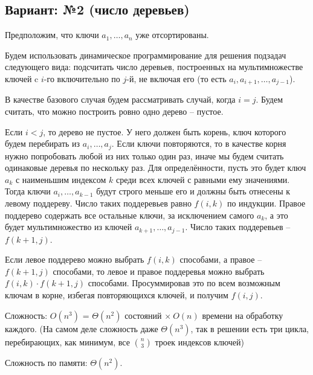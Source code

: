 \documentclass[a4paper, 12pt, onepage]{article}
\begin{document}
\subsection*{Вариант: №2 (число деревьев)}

Предположим, что ключи $a_1, \ldots, a_n$ уже отсортированы.

Будем использовать динамическое программирование для решения подзадач
следующего вида: подсчитать число деревьев, построенных на мультимножестве ключей
c $i$-го включительно по $j$-й, не включая его (то есть $a_i, a_{i+1}, \ldots, a_{j-1}$).

В качестве базового случая будем рассматривать случай, когда $i=j$.
Будем считать, что можно построить ровно одно дерево -- пустое.

Если $i < j$, то дерево не пустое. У него должен быть корень, ключ которого
будем перебирать из $a_i, \ldots, a_j$. Если ключи повторяются, то
в качестве корня нужно попробовать любой из них только один раз,
иначе мы будем считать одинаковые деревья по нескольку раз.
Для определённости, пусть это будет ключ $a_k$ с наименьшим индексом $k$ среди всех ключей
с равными ему значениями. Тогда ключи $a_i, \ldots, a_{k-1}$ будут строго
меньше его и должны быть отнесены к левому поддереву. Число таких
поддеревьев равно $f(i, k)$ по индукции.
Правое поддерево содержать все остальные ключи, за исключением
самого $a_k$, а это будет мультимножество из ключей $a_{k+1}, \ldots, a_{j-1}$.
Число таких поддеревьев -- $f(k+1, j)$.

Если левое поддерево можно выбрать $f(i,k)$ способами, а правое -- $f(k+1, j)$
способами, то левое и правое поддеревья можно выбрать $f(i,k) \cdot f(k+1, j)$
способами. Просуммировав это по всем возможным ключам в корне, избегая повторяющихся ключей,
и получим $f(i,j)$.

\bigskip

Сложность: $O(n^3)$ = $\Theta(n^2)$ состояний $\times\ O(n)$ времени на обработку каждого.
(На самом деле сложность даже $\Theta(n^3)$, так в решении есть три цикла, перебирающих, как минимум, все ${n \choose 3}$
троек индексов ключей)

Сложность по памяти: $\Theta(n^2)$.
\end{document}
